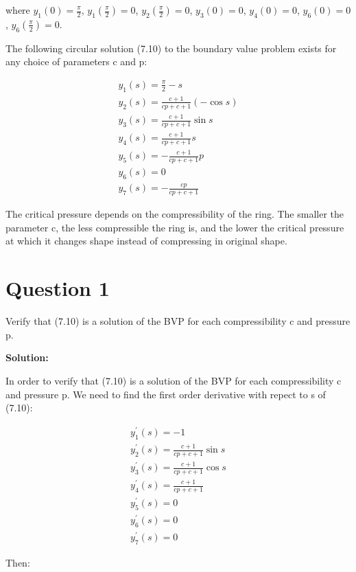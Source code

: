 \documentclass{article}
\begin{document}
where
$y_{1}(0)=\frac{\pi}{2}$, $y_{1}(\frac{\pi}{2})=0$,
$y_{2}(\frac{\pi}{2})=0$,
$y_{3}(0)=0$,
$y_{4}(0)=0$,
$y_{6}(0)=0$,
$y_{6}(\frac{\pi}{2})=0$.

The following circular solution (7.10) to the boundary value problem exists for any choice of parameters c and p:

$$
\begin{array}{l}
	y_{1}(s)=\frac{\pi}{2}-s\\ 
	y_{2}(s)=\frac{c+1}{c p+c+1}(-\cos s)\\ 
	y_{3}(s)=\frac{c+1}{c p+c+1} \sin s\\ 
	y_{4}(s)=\frac{c+1}{c p+c+1} s\\ 
	y_{5}(s)=-\frac{c+1}{c p+c+1} p\\ 
	y_{6}(s)=0\\ 
	y_{7}(s)=-\frac{c p}{c p+c+1}
\end{array}
$$

The critical pressure depends on the compressibility of the ring. The smaller the parameter
c, the less compressible the ring is, and the lower the critical pressure at which it changes
shape instead of compressing in original shape. 

\section*{Question 1} 
Verify that (7.10) is a solution of the BVP for each compressibility c and pressure p.

\textbf{Solution:} 

In order to verify that (7.10) is a solution of the BVP for each compressibility c and pressure p. We need to find the first order derivative  with repect to s of (7.10):

$$
\begin{array}{l}
	y^{'}_{1}(s)=-1\\ 
	y^{'}_{2}(s)=\frac{c+1}{c p+c+1}\sin s\\ 
	y^{'}_{3}(s)=\frac{c+1}{c p+c+1} \cos s\\ 
	y^{'}_{4}(s)=\frac{c+1}{c p+c+1}\\ 
	y^{'}_{5}(s)=0\\ 
	y^{'}_{6}(s)=0\\ 
	y^{'}_{7}(s)=0
\end{array}
$$

Then:
\end{document}
